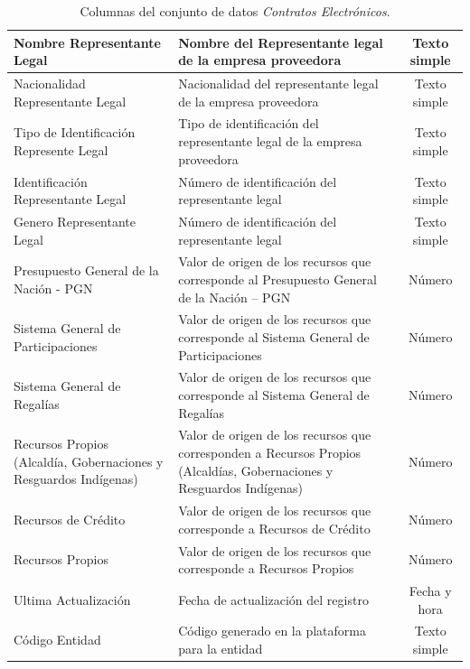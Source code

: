 \documentclass[11pt,letterpaper,oneside]{article}
\begin{document}
\begin{table}[!htp]
\begin{tabular}{|p{3cm}|p{6.5cm}|c|}
		\hline
		Nombre Representante Legal & Nombre del Representante legal de la empresa proveedora & Texto simple \\
		\hline
		Nacionalidad Representante Legal & Nacionalidad del representante legal de la empresa proveedora & Texto simple \\
		\hline
		Tipo de Identificación Represente Legal & Tipo de identificación del representante legal de la empresa proveedora & Texto simple \\
		\hline
		Identificación Representante Legal & Número de identificación del representante legal & Texto simple \\
		\hline
		Genero Representante Legal & Número de identificación del representante legal & Texto simple \\
		\hline
		Presupuesto General de la Nación - PGN & Valor de origen de los recursos que corresponde al Presupuesto General de la Nación – PGN & Número \\
		\hline
		Sistema General de Participaciones & Valor de origen de los recursos que corresponde al Sistema General de Participaciones & Número \\
		\hline
		Sistema General de Regalías & Valor de origen de los recursos que corresponde al Sistema General de Regalías & Número \\
		\hline
		Recursos Propios (Alcaldía, Gobernaciones y Resguardos Indígenas)& Valor de origen de los recursos que corresponden a Recursos Propios (Alcaldías, Gobernaciones y Resguardos Indígenas) & Número \\
		\hline
		Recursos de Crédito & Valor de origen de los recursos que corresponde a Recursos de Crédito & Número \\
		\hline
		Recursos Propios & Valor de origen de los recursos que corresponde a Recursos Propios & Número \\
		\hline
		Ultima Actualización & Fecha de actualización del registro & Fecha y hora \\
		\hline
		Código Entidad & Código generado en la plataforma para la entidad & Texto simple \\ \hline
	\end{tabular}
	\caption{Columnas del conjunto de datos \textit{Contratos Electrónicos}.}
	\label{tab:t02}
	\end{table}
\end{document}
